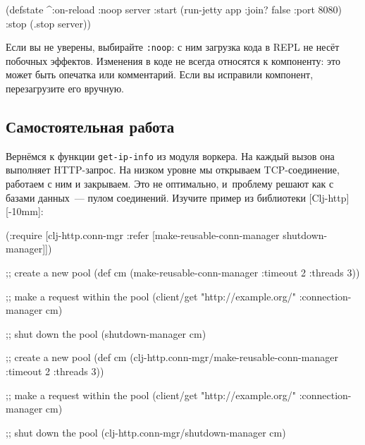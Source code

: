 \else

\begin{english}
  \begin{clojure}
(defstate
  ^{:on-reload :noop}
  server
  :start (run-jetty app {:join? false :port 8080})
  :stop (.stop server))
  \end{clojure}
\end{english}

\fi

Если вы не уверены, выбирайте \verb|:noop|: с ним загрузка кода в REPL не
несёт побочных эффектов. Изменения в коде не всегда относятся к компоненту: это
может быть опечатка или комментарий. Если вы исправили компонент, перезагрузите
его вручную.

\subsection{Самостоятельная работа}


Вернёмся к функции \verb|get-ip-info| из модуля воркера. На каждый вызов она
выполняет HTTP-запрос. На низком уровне мы открываем TCP-соединение, работаем с
ним и закрываем. Это не оптимально, и~проблему решают как с базами данных~---
пулом соединений. Изучите пример из библиотеки
[Clj-http][-10mm]:

\ifx\DEVICETYPE\MOBILE

\begin{english}
  \begin{clojure}
(:require
 [clj-http.conn-mgr :refer
   [make-reusable-conn-manager
    shutdown-manager]])

;; create a new pool
(def cm (make-reusable-conn-manager
         {:timeout 2 :threads 3}))

;; make a request within the pool
(client/get "http://example.org/"
            {:connection-manager cm})

;; shut down the pool
(shutdown-manager cm)
  \end{clojure}
\end{english}

\else

\begin{english}
  \begin{clojure}
;; create a new pool
(def cm (clj-http.conn-mgr/make-reusable-conn-manager
         {:timeout 2 :threads 3}))

;; make a request within the pool
(client/get "http://example.org/"
            {:connection-manager cm})

;; shut down the pool
(clj-http.conn-mgr/shutdown-manager cm)
  \end{clojure}
\end{english}

